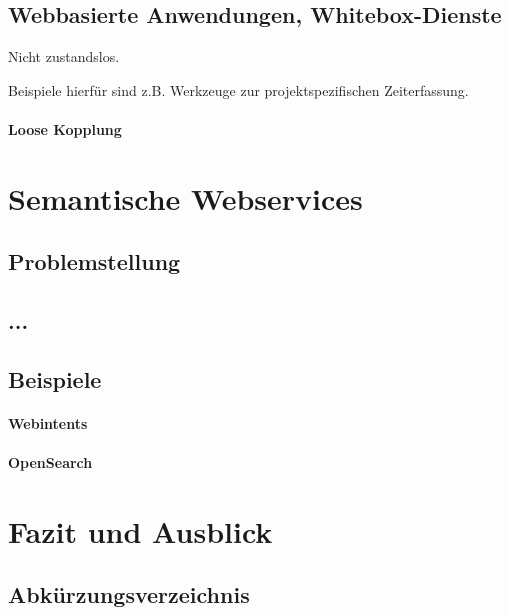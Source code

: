 \documentclass[10pt,a4paper]{article}
\begin{document}
\subsection{Webbasierte Anwendungen, Whitebox-Dienste}
\label{l:webanw}
Nicht zustandslos.

Beispiele hierfür sind z.B. Werkzeuge zur projektspezifischen Zeiterfassung. 
\paragraph{Loose Kopplung}
\label{l:loosec}

\section{Semantische Webservices}

\subsection{Problemstellung}

\subsection{...}

\subsection{Beispiele}

\paragraph{Webintents}

\paragraph{OpenSearch}

\section{Fazit und Ausblick}

\pagebreak

\subsection*{Abkürzungsverzeichnis}
\begin{acronym}
\end{acronym}


\end{document}
